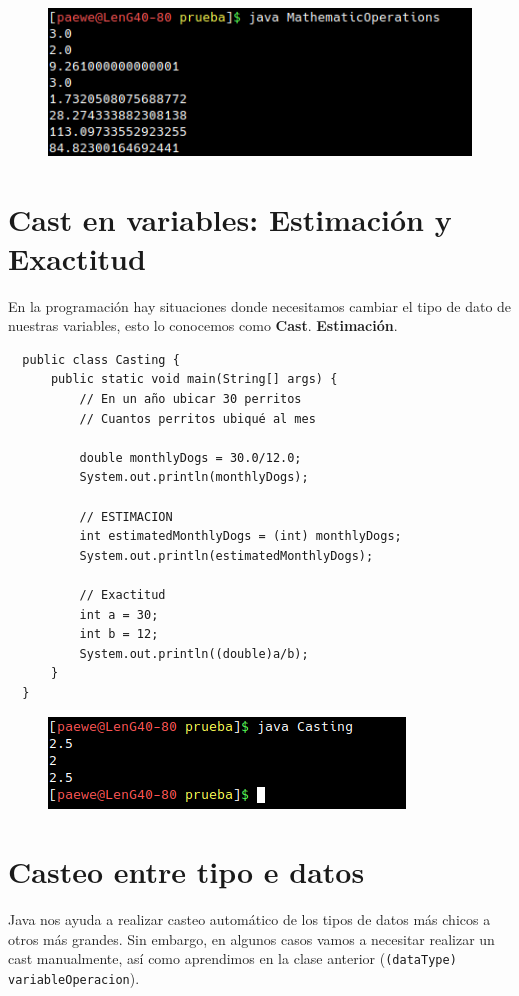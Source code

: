 \documentclass{article}
\begin{document}
\begin{figure}[h!]
  \centering
  \includegraphics[scale=0.75]{./Pictures/042_MathematicOperations.png}
\end{figure}


\section{Cast en variables: Estimación y Exactitud}%
En la programación hay situaciones donde necesitamos cambiar el tipo de dato de
nuestras variables, esto lo conocemos como \textbf{Cast}. \textbf{Estimación}.

\begin{verbatim}
  public class Casting {
      public static void main(String[] args) {
          // En un año ubicar 30 perritos
          // Cuantos perritos ubiqué al mes

          double monthlyDogs = 30.0/12.0;
          System.out.println(monthlyDogs);

          // ESTIMACION
          int estimatedMonthlyDogs = (int) monthlyDogs;
          System.out.println(estimatedMonthlyDogs);

          // Exactitud
          int a = 30;
          int b = 12;
          System.out.println((double)a/b);
      }
  }
\end{verbatim}

\begin{figure}[h!]
  \centering
  \includegraphics[scale=0.75]{./Pictures/043_Casting.png}
\end{figure}


\section{Casteo entre tipo e datos}%
Java nos ayuda a realizar casteo automático de los tipos de datos más chicos a
otros más grandes. Sin embargo, en algunos casos vamos a necesitar realizar un
cast manualmente, así como aprendimos en la clase anterior (\texttt{(dataType)
variableOperacion}).\\
\end{document}
